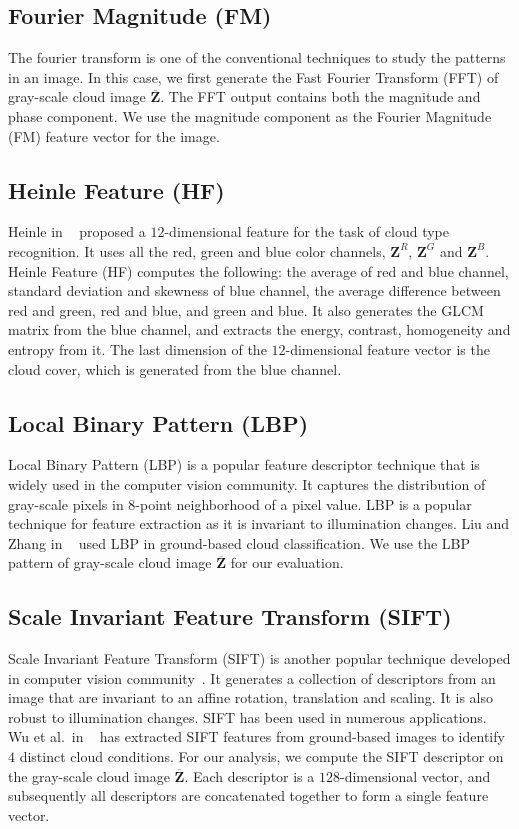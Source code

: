 \subsection{Fourier Magnitude (FM)}
The fourier transform is one of the conventional techniques to study the patterns in an image. In this case, we first generate the Fast Fourier Transform (FFT) of gray-scale cloud image $\overline{\mathbf{Z}}$. The FFT output contains both the magnitude and phase component. We use the magnitude component as the Fourier Magnitude (FM) feature vector for the image. 

\subsection{Heinle Feature (HF)}
Heinle in ~\cite{Heinle2010} proposed a $12$-dimensional feature for the task of cloud type recognition. It uses all the red, green and blue color channels, $\mathbf{Z}^R$, $\mathbf{Z}^G$ and $\mathbf{Z}^B$. Heinle Feature (HF) computes the following: the average of red and blue channel, standard deviation and skewness of blue channel, the average difference between red and green, red and blue, and green and blue. It also generates the GLCM matrix from the blue channel, and extracts the energy, contrast, homogeneity and entropy from it. The last dimension of the $12$-dimensional feature vector is the cloud cover, which is generated from the blue channel. 

\subsection{Local Binary Pattern (LBP)}
Local Binary Pattern (LBP) is a popular feature descriptor technique that is widely used in the computer vision community. It captures the distribution of gray-scale pixels in $8$-point neighborhood of a pixel value. LBP is a popular technique for feature extraction as it is invariant to illumination changes. Liu and Zhang in ~\cite{Liu16} used LBP in ground-based cloud classification. We use the LBP pattern of gray-scale cloud image $\overline{\mathbf{Z}}$ for our evaluation. 

\subsection{Scale Invariant Feature Transform (SIFT)}

Scale Invariant Feature Transform (SIFT) is another popular technique developed in computer vision community~\cite{SIFT}. It generates a collection of descriptors from an image that are invariant to an affine rotation, translation and scaling. It is also robust to illumination changes. SIFT has been used in numerous applications. Wu et al.\ in ~\cite{Wu15SIFT} has extracted SIFT features from ground-based images to identify $4$ distinct cloud conditions. For our analysis, we compute the SIFT descriptor on the gray-scale cloud image $\overline{\mathbf{Z}}$. Each descriptor is a $128$-dimensional vector, and subsequently all descriptors are concatenated together to form a single feature vector. 


